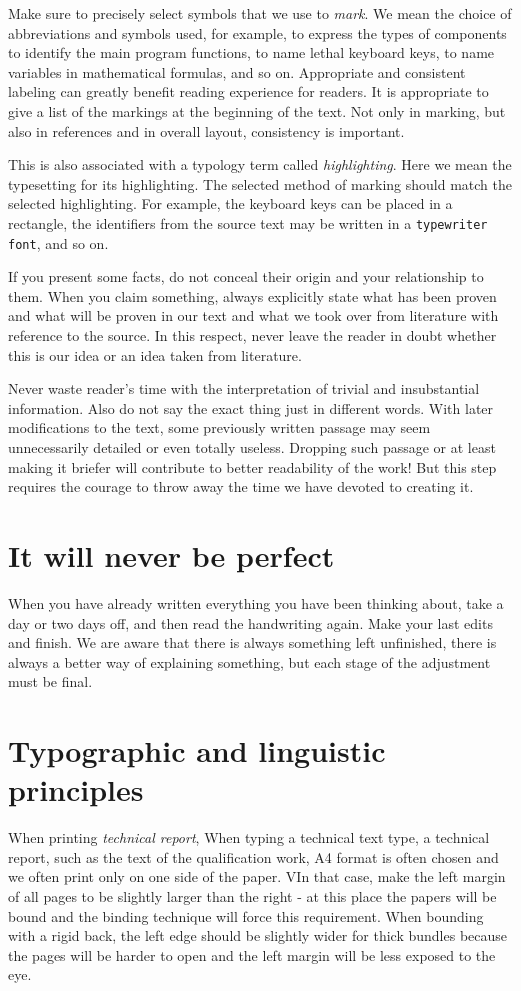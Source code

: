 Make sure to precisely select symbols that we use to {\it mark}. We mean the choice of abbreviations and symbols used, for example, to express the types of components to identify the main program functions, to name lethal keyboard keys, to name variables in mathematical formulas, and so on. Appropriate and consistent labeling can greatly benefit reading experience for readers. It is appropriate to give a list of the markings at the beginning of the text. Not only in marking, but also in references and in overall layout, consistency is important.

This is also associated with a typology term called {\it highlighting}. Here we mean the typesetting for its highlighting. The selected method of marking should match the selected highlighting. For example, the keyboard keys can be placed in a rectangle, the identifiers from the source text may be written in a {\tt typewriter font}, and so on.

If you present some facts, do not conceal their origin and your relationship to them. When you claim something, always explicitly state what has been proven and what will be proven in our text and what we took over from literature with reference to the source. In this respect, never leave the reader in doubt whether this is our idea or an idea taken from literature.

Never waste reader's time with the interpretation of trivial and insubstantial information. Also do not say the exact thing just in different words. With later modifications to the text, some previously written passage may seem unnecessarily detailed or even totally useless. Dropping such passage or at least making it briefer will contribute to better readability of the work! But this step requires the courage to throw away the time we have devoted to creating it.


\chapter{It will never be perfect}
When you have already written everything you have been thinking about, take a day or two days off, and then read the handwriting again. Make your last edits and finish. We are aware that there is always something left unfinished, there is always a better way of explaining something, but each stage of the adjustment must be final.

\chapter{Typographic and linguistic principles}
When printing {\it technical report}, When typing a technical text type, a technical report, such as the text of the qualification work, A4 format is often chosen and we often print only on one side of the paper. VIn that case, make the left margin of all pages to be slightly larger than the right - at this place the papers will be bound and the binding technique will force this requirement. When bounding with a rigid back, the left edge should be slightly wider for thick bundles because the pages will be harder to open and the left margin will be less exposed to the eye.

